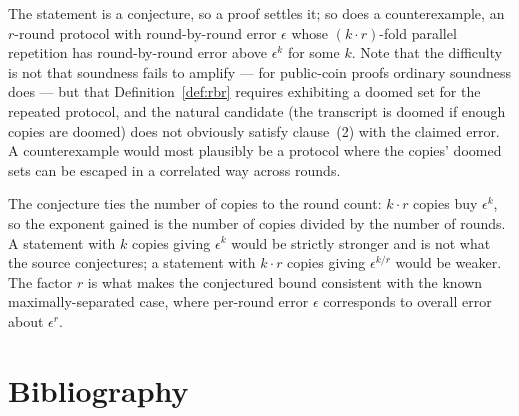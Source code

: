 \documentclass{aicr-conjecture}
\newcommand{\eps}{\epsilon}
\begin{document}
\begin{remark}\label{rem:counterexample}
The statement is a conjecture, so a proof settles it; so does a
counterexample, an $r$-round protocol with round-by-round error $\eps$
whose $(k \cdot r)$-fold parallel repetition has round-by-round error
above $\eps^{k}$ for some $k$. Note that the difficulty is not that
soundness fails to amplify --- for public-coin proofs ordinary soundness
does --- but that Definition~\ref{def:rbr} requires exhibiting a doomed
set for the repeated protocol, and the natural candidate (the transcript
is doomed if enough copies are doomed) does not obviously satisfy
clause~(2) with the claimed error. A counterexample would most plausibly
be a protocol where the copies' doomed sets can be escaped in a
correlated way across rounds.
\end{remark}

\begin{remark}
The conjecture ties the number of copies to the round count: $k \cdot r$
copies buy $\eps^{k}$, so the exponent gained is the number of copies
divided by the number of rounds. A statement with $k$ copies giving
$\eps^{k}$ would be strictly stronger and is not what the source
conjectures; a statement with $k \cdot r$ copies giving $\eps^{k/r}$
would be weaker. The factor $r$ is what makes the conjectured bound
consistent with the known maximally-separated case, where per-round error
$\eps$ corresponds to overall error about $\eps^{r}$.
\end{remark}

\section{Bibliography}
\end{document}
